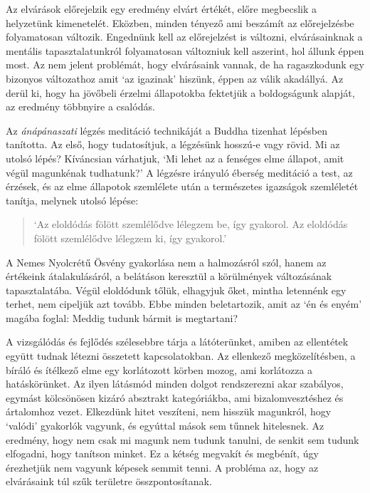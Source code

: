 Az elvárások előrejelzik egy eredmény elvárt értékét, előre megbecslik a
helyzetünk kimenetelét. Eközben, minden tényező ami beszámít az
előrejelzésbe folyamatosan változik. Engednünk kell az előrejelzést is
változni, elvárásainknak a mentális tapasztalatunkról folyamatosan
változniuk kell aszerint, hol állunk éppen most. Az nem jelent
problémát, hogy elvárásaink vannak, de ha ragaszkodunk egy bizonyos
változathoz amit `az igazinak' hiszünk, éppen az válik akadállyá. Az
derül ki, hogy ha jövőbeli érzelmi állapotokba fektetjük a boldogságunk
alapját, az eredmény többnyire a csalódás.

Az \emph{ánápánaszati} légzés meditáció technikáját a Buddha tizenhat
lépésben tanította. Az első, hogy tudatosítjuk, a légzésünk hosszú-e
vagy rövid. Mi az utolsó lépés? Kíváncsian várhatjuk, `Mi lehet az a
fenséges elme állapot, amit végül magunkénak tudhatunk?' A légzésre
irányuló éberség meditáció a test, az érzések, és az elme állapotok
szemlélete után a természetes igazságok szemléletét tanítja, melynek
utolsó lépése:

\begin{quote}
`Az eloldódás fölött szemlélődve lélegzem be, így gyakorol. Az eloldódás
fölött szemlélődve lélegzem ki, így gyakorol.'

\bigskip

\end{quote}

A Nemes Nyolcrétű Ösvény gyakorlása nem a halmozásról szól, hanem az
értékeink átalakulásáról, a belátáson keresztül a körülmények
változásának tapasztalatába. Végül eloldódunk tőlük, elhagyjuk őket,
mintha letennénk egy terhet, nem cipeljük azt tovább. Ebbe minden
beletartozik, amit az `én és enyém' magába foglal: Meddig tudunk bármit
is megtartani?


A vizsgálódás és fejlődés szélesebbre tárja a látóterünket, amiben az
ellentétek együtt tudnak létezni összetett kapcsolatokban. Az ellenkező
megközelítésben, a bíráló és ítélkező elme egy korlátozott körben mozog,
ami korlátozza a hatáskörünket. Az ilyen látásmód minden dolgot
rendszerezni akar szabályos, egymást kölcsönösen kizáró absztrakt
kategóriákba, ami bizalomvesztéshez és ártalomhoz vezet. Elkezdünk hitet
veszíteni, nem hisszük magunkról, hogy `valódi' gyakorlók vagyunk, és
egyúttal mások sem tűnnek hitelesnek. Az eredmény, hogy nem csak mi
magunk nem tudunk tanulni, de senkit sem tudunk elfogadni, hogy tanítson
minket. Ez a kétség megvakít és megbénít, úgy érezhetjük nem vagyunk
képesek semmit tenni. A probléma az, hogy az elvárásaink túl szűk
területre összpontosítanak.

